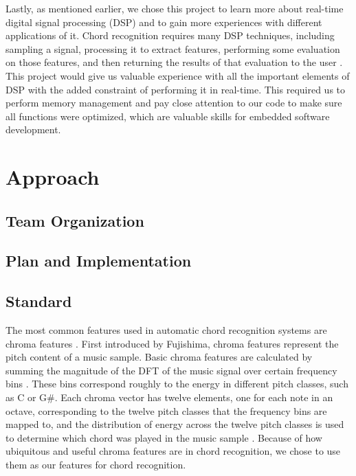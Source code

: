 \documentclass[journal]{IEEEtran}
\begin{document}
Lastly, as mentioned earlier, we chose this project to learn more about real-time digital signal processing (DSP) and to gain more experiences with different applications of it.
Chord recognition requires many DSP techniques, including sampling a signal, processing it to extract features, performing some evaluation on those features, and then returning the results of that evaluation to the user \cite{fujishima}.
This project would give us valuable experience with all the important elements of DSP with the added constraint of performing it in real-time.
This required us to perform memory management and pay close attention to our code to make sure all functions were optimized, which are valuable skills for embedded software development.

\section{Approach}
\subsection{Team Organization}

\subsection{Plan and Implementation}

\subsection{Standard}
The most common features used in automatic chord recognition systems are chroma features \cite{cho_chroma}.
First introduced by Fujishima, chroma features represent the pitch content of a music sample.
Basic chroma features are calculated by summing the magnitude of the DFT of the music signal over certain frequency bins \cite{fujishima}.
These bins correspond roughly to the energy in different pitch classes, such as C or G\#.
Each chroma vector has twelve elements, one for each note in an octave, corresponding to the twelve pitch classes that the frequency bins are mapped to, and the distribution of energy across the twelve pitch classes is used to determine which chord was played in the music sample \cite{jiang}.
Because of how ubiquitous and useful chroma features are in chord recognition, we chose to use them as our features for chord recognition.
\end{document}
